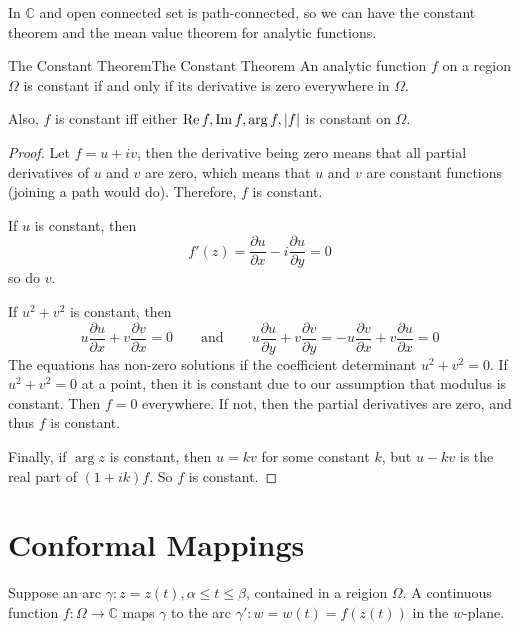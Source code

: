 \documentclass[../main.tex]{subfiles}
\begin{document}
In $\mathbb{C}$ and open connected set is path-connected, so we can have the constant theorem and the mean value theorem for analytic functions.

\begin{theorem}{The Constant Theorem}{The Constant Theorem}
An analytic function $f$ on a region $\Omega$ is constant if and only if its derivative is zero everywhere in $\Omega$.

Also, $f$ is constant iff either $\operatorname{Re} f, \operatorname{Im} f, \arg f, \left|f\right|$ is constant on $\Omega$.
\end{theorem}
\begin{proof}
Let $f=u+iv$, then the derivative being zero means that all partial derivatives of $u$ and $v$ are zero, which means that $u$ and $v$ are constant functions (joining a path would do). Therefore, $f$ is constant.

If $u$ is constant, then
\begin{equation*}
f'(z) = \frac{\partial u}{\partial x} - i \frac{\partial u}{\partial y} = 0
\end{equation*}
so do $v$.

If $u^2+v^2$ is constant, then
\begin{equation*}
	u \frac{\partial u}{\partial x} + v \frac{\partial v}{\partial x} = 0 \qquad \text{and} \qquad u \frac{\partial u}{\partial y} + v \frac{\partial v}{\partial y} = -u \frac{\partial v}{\partial x} + v \frac{\partial u}{\partial x} = 0
\end{equation*}
The equations has non-zero solutions if the coefficient determinant $u^2+v^2 = 0$. If $u^2+v^2 = 0$ at a point, then it is constant due to our assumption that modulus is constant. Then $f=0$ everywhere. If not, then the partial derivatives are zero, and thus $f$ is constant.

Finally, if $\arg z$ is constant, then $u=kv$ for some constant $k$, but $u-kv$ is the real part of $(1+ik)f$. So $f$ is constant.
\end{proof}


\section{Conformal Mappings}

Suppose an arc $\gamma:z=z(t), \alpha \leq t\leq \beta$, contained in a reigion $\Omega$. A continuous function $f: \Omega \rightarrow \mathbb{C}$ maps $\gamma$ to the arc $\gamma': w=w(t)=f(z(t))$ in the $w$-plane. 
\end{document}
